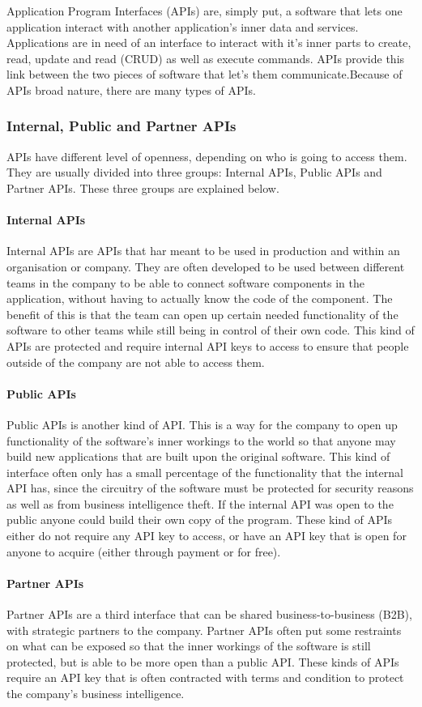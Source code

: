 \documentclass{article}
\begin{document}
Application Program Interfaces (APIs) are, simply put, a software that
lets one application interact with another application's inner data and
services. Applications are in need of an interface to interact with it's
inner parts to create, read, update and read (CRUD) as well as execute
commands. APIs provide this link between the two pieces of software that let's
them communicate.Because of APIs broad nature, there are many types of
APIs.

\subsubsection{Internal, Public and Partner APIs}
APIs have different level of openness, depending on who is going to access them. They are
usually divided into three groups: Internal APIs, Public APIs and Partner APIs. These
three groups are explained below.
\paragraph{Internal APIs}
Internal APIs are APIs that har meant to be used in production and
within an organisation or company. They are often developed to be used
between different teams in the company to be able to connect software
components in the application, without having to actually know the code
of the component. The benefit of this is that the team can open up certain
needed functionality of the software to other teams while still being in
control of their own code. This kind of APIs are protected and require
internal API keys to access to ensure that people outside of the company
are not able to access them.
\paragraph{Public APIs}
Public APIs is another kind of API. This is a way for the company to
open up functionality of the software's inner workings to the world so
that anyone may build new applications that are built upon the original
software. This kind of interface often only has a small percentage of
the functionality that the internal API has, since the circuitry of the
software must be protected for security reasons as well as from business
intelligence theft. If the internal API was open to the public anyone
could build their own copy of the program. These kind of APIs either do
not require any API key to access, or have an API key that is open for
anyone to acquire (either through payment or for free).
\paragraph{Partner APIs}
Partner APIs are a third interface that can be shared
business-to-business (B2B), with strategic partners to the company.
Partner APIs often put some restraints on what can be exposed so that
the inner workings of the software is still protected, but is able to be
more open than a public API. These kinds of APIs require an API key that
is often contracted with terms and condition to protect the company's
business intelligence.\cite{levin}
\end{document}

